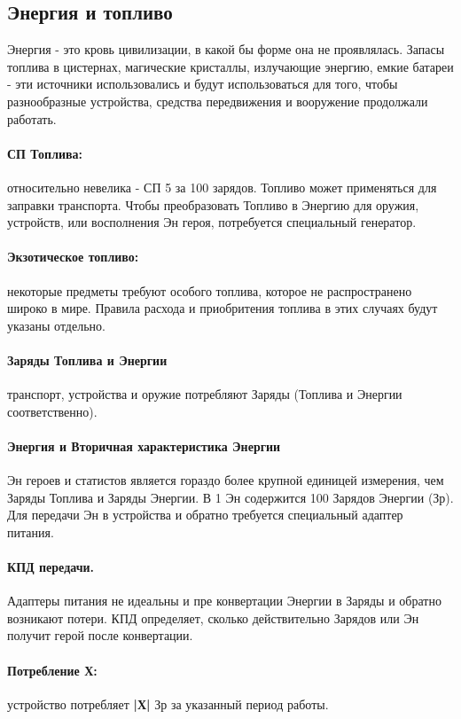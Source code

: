\subsection{Энергия и топливо}

Энергия - это кровь цивилизации, в какой бы форме она не проявлялась. Запасы топлива в цистернах, магические кристаллы, излучающие энергию, емкие батареи - эти источники использовались и будут использоваться для того, чтобы разнообразные устройства, средства передвижения и вооружение продолжали работать.

\paragraph{СП Топлива:} относительно невелика - СП 5 за 100 зарядов. Топливо может применяться для заправки транспорта. Чтобы преобразовать Топливо в Энергию для оружия, устройств, или восполнения Эн героя, потребуется специальный генератор.

\paragraph{Экзотическое топливо:} некоторые предметы требуют особого топлива, которое не распространено широко в мире. Правила расхода и приобритения топлива в этих случаях будут указаны отдельно.

\paragraph{Заряды Топлива и Энергии} транспорт, устройства и оружие потребляют Заряды (Топлива и Энергии соответственно).

\paragraph{Энергия и Вторичная характеристика Энергии} Эн героев и статистов является гораздо более крупной единицей измерения, чем Заряды Топлива и Заряды Энергии. В 1 Эн содержится 100 Зарядов Энергии (Зр). Для передачи Эн в устройства и обратно требуется специальный адаптер питания.
\paragraph{КПД передачи.} Адаптеры питания не идеальны и пре конвертации Энергии в Заряды и обратно возникают потери. КПД определяет, сколько действительно Зарядов или Эн получит герой после конвертации.
\paragraph{Потребление Х:} устройство потребляет \textbf{|Х|} Зр за указанный период работы.

